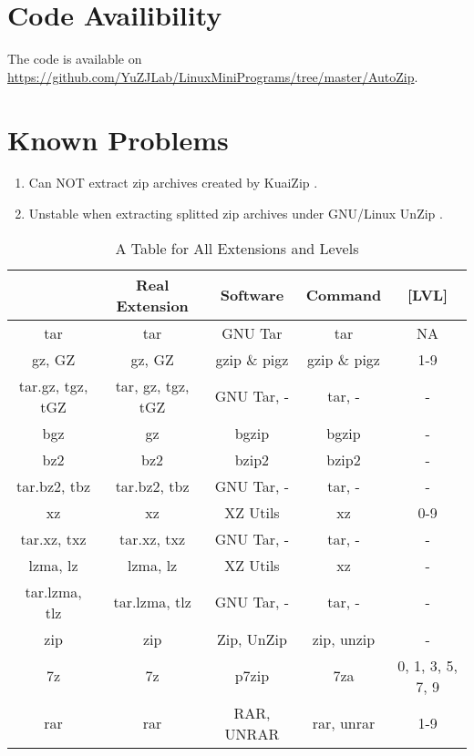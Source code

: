 \documentclass[journal,twocolumn]{IEEEtran}
\begin{document}
\section{Code Availibility}
The code is available on \url{https://github.com/YuZJLab/LinuxMiniPrograms/tree/master/AutoZip}.
\section{Known Problems}
\begin{enumerate}
\item Can NOT extract zip archives created by KuaiZip \cite{KuaiZip}.
\item Unstable when extracting splitted zip archives under GNU/Linux UnZip \cite{UnZip}.
\end{enumerate}

\newpage
\onecolumn
\begin{table}
\centering
\begin{tabular}{|c|c|c|c|c|}
\hline\hline
[EXT] & Real Extension & Software & Command & [LVL] \\\hline\hline
tar & tar & GNU Tar & tar & NA \\\hline
gz, GZ & gz, GZ & gzip \& pigz & gzip \& pigz & 1-9 \\\hline
tar.gz, tgz, tGZ & tar, gz, tgz, tGZ & GNU Tar, - & tar, - & - \\\hline
bgz & gz & bgzip & bgzip & - \\\hline
bz2 & bz2 & bzip2 & bzip2 & - \\\hline
tar.bz2, tbz & tar.bz2, tbz & GNU Tar, - & tar, - & - \\\hline
xz & xz & XZ Utils & xz & 0-9 \\\hline
tar.xz, txz & tar.xz, txz & GNU Tar, - & tar, - & - \\\hline
lzma, lz & lzma, lz & XZ Utils & xz & - \\\hline
tar.lzma, tlz & tar.lzma, tlz & GNU Tar, - & tar, - & - \\\hline
zip & zip & Zip, UnZip & zip, unzip & - \\\hline
7z & 7z & p7zip & 7za & 0, 1, 3, 5, 7, 9 \\\hline
rar & rar & RAR, UNRAR & rar, unrar & 1-9 \\\hline\hline
\end{tabular}
\caption{A Table for All Extensions and Levels}
\label{tbl:AllExt}
\end{table}
\end{document}
